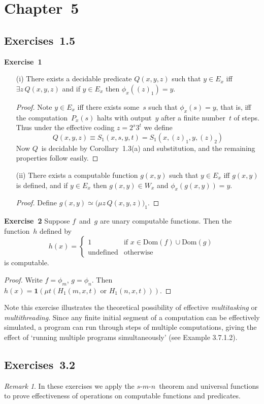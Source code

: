 \documentclass[letterpaper]{article}
\newcommand{\exercise}[2][]{\noindent\textbf{Exercise~{#2}}\ifthenelse{\isempty{#1}}{\textbf{.}}{ ({#1})\textbf{.}}}
\newcommand{\union}{\cup}
\newcommand{\dom}{\mathrm{Dom}}
\newcommand{\smn}{$s$-$m$-$n$}
\theoremstyle{plain}
\theoremstyle{definition}
\theoremstyle{remark}
\newtheorem*{rmk}{Remark}
\begin{document}
\section*{Chapter~5}
\subsection*{Exercises~1.5}
\exercise{1}
\begin{enumerate}
\item[(i)] There exists a decidable predicate $Q(x,y,z)$ such that $y\in E_x$ iff $\exists z\,Q(x,y,z)$ and if $y\in E_x$ then $\phi_x((z)_1)=y$.
\begin{proof}
Note $y\in E_x$ iff there exists some~$s$ such that $\phi_x(s)=y$, that is, iff the computation~$P_x(s)$ halts with output~$y$ after a finite number~$t$ of steps. Thus under the effective coding $z=2^s3^t$ we define
$$Q(x,y,z)\equiv S_1(x,s,y,t)=S_1(x,(z)_1,y,(z)_2)$$
Now $Q$~is decidable by Corollary~1.3(a) and substitution, and the remaining properties follow easily.
\end{proof}
\item[(ii)] There exists a computable function $g(x,y)$ such that $y\in E_x$ iff $g(x,y)$ is defined, and if $y\in E_x$ then $g(x,y)\in W_x$ and $\phi_x(g(x,y))=y$.
\begin{proof}
Define $g(x,y)\simeq\bigl(\mu z\,Q(x,y,z)\bigr)_1$.
\end{proof}
\end{enumerate}

\exercise{2}
Suppose $f$~and~$g$ are unary computable functions. Then the function~$h$ defined by
$$h(x)=\begin{cases}
1&\text{if }x\in\dom(f)\union\dom(g)\\
\text{undefined}&\text{otherwise}
\end{cases}$$
is computable.
\begin{proof}
Write $f=\phi_m$, $g=\phi_n$. Then $h(x)=\mathbf{1}(\mu t(H_1(m,x,t)\text{ or }H_1(n,x,t)))$.
\end{proof}
\noindent Note this exercise illustrates the theoretical possibility of effective \emph{multitasking} or \emph{multithreading}. Since any finite initial segment of a computation can be effectively simulated, a program can run through steps of multiple computations, giving the effect of `running multiple programs simultaneously' (see Example 3.7.1.2).

\subsection*{Exercises~3.2}
\begin{rmk}
In these exercises we apply the \smn\ theorem and universal functions to prove effectiveness of operations on computable functions and predicates.
\end{rmk}
\end{document}
